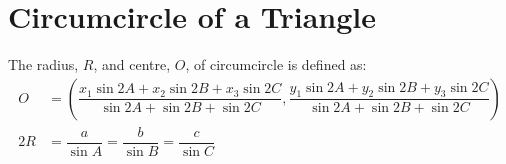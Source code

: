 \documentclass[../main.tex]{subfile}
\begin{document}
\section{Circumcircle of a Triangle}
	The radius, $R$, and centre, $O$, of circumcircle is defined as:
	\begin{align}
		O & = \left( \dfrac{x_1 \sin 2A + x_2 \sin 2B + x_3 \sin 2C}{\sin 2A + \sin 2B + \sin 2C}, \dfrac{y_1 \sin 2A + y_2 \sin 2B + y_3 \sin 2C}{\sin 2A + \sin 2B + \sin 2C} \right)\\
		2R & = \dfrac{a}{\sin A} = \dfrac{b}{\sin B} = \dfrac{c}{\sin C}
	\end{align}
\end{document}
